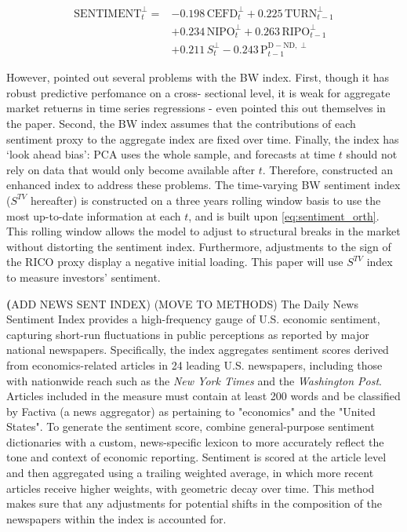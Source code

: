\begin{equation} %
    \label{eq:sentiment_orth}
    \begin{split}
    \text{SENTIMENT}^{\perp}_t = &-0.198\,\text{CEFD}^{\perp}_t + 0.225\,\text{TURN}^{\perp}_{t-1} \\
    &+ 0.234\,\text{NIPO}^{\perp}_t + 0.263\,\text{RIPO}^{\perp}_{t-1} \\
    &+ 0.211\,S^{\perp}_t - 0.243\,\text{P}^{\text{D} - \text{ND},\perp}_{t-1}
    \end{split}
\end{equation}

However,  pointed out several problems with the BW index. First, though it has robust predictive perfomance on a cross- sectional level, it is weak for aggregate market retuerns in time series regressions - even  pointed this out themselves in the paper. Second, the BW index assumes that the contributions of each sentiment proxy to the aggregate index are fixed over time. Finally, the index has `look ahead bias': PCA uses the whole sample, and forecasts at time $t$ should not rely on data that would only become available after $t$. Therefore,  constructed an enhanced index to address these problems. The time-varying BW sentiment index ($S^{TV}$ hereafter) is constructed on a three years rolling window basis to use the most up-to-date information at each $t$, and is built upon \cref{eq:sentiment_orth}. This rolling window allows the model to adjust to structural breaks in the market without distorting the sentiment index. Furthermore, adjustments to the sign of the RICO proxy display a negative initial loading. This paper will use  $S^{TV}$ index to measure investors' sentiment.

\textbf(ADD NEWS SENT INDEX) 
(MOVE TO METHODS) The Daily News Sentiment Index provides a high-frequency gauge of U.S. economic sentiment, capturing short-run fluctuations in public perceptions as reported by major national newspapers. Specifically, the index aggregates sentiment scores derived from economics-related articles in 24 leading U.S. newspapers, including those with nationwide reach such as the \emph{New York Times} and the \emph{Washington Post}. Articles included in the measure must contain at least 200 words and be classified by Factiva (a news aggregator) as pertaining to "economics" and the "United States". To generate the sentiment score,  combine general-purpose sentiment dictionaries with a custom, news-specific lexicon to more accurately reflect the tone and context of economic reporting. Sentiment is scored at the article level and then aggregated using a trailing weighted average, in which more recent articles receive higher weights, with geometric decay over time. This method makes sure that any adjustments for potential shifts in the composition of the newspapers within the index is accounted for.


